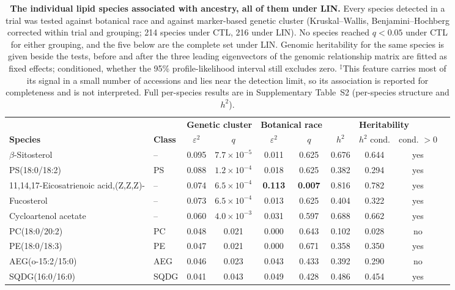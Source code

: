 \documentclass[9pt,twocolumn,twoside]{rilabRxiv}
\begin{document}
\begin{table}[!ht]
\centering
\caption{\textbf{The individual lipid species associated with ancestry, all of them under LIN.} Every species detected in a trial was tested against botanical race and against marker-based genetic cluster (Kruskal--Wallis, Benjamini--Hochberg corrected within trial and grouping; 214 species under CTL, 216 under LIN). No species reached $q<0.05$ under CTL for either grouping, and the five below are the complete set under LIN. Genomic heritability for the same species is given beside the tests, before and after the three leading eigenvectors of the genomic relationship matrix are fitted as fixed effects; conditioned, whether the 95\% profile-likelihood interval still excludes zero. $^{\ddagger}$This feature carries most of its signal in a small number of accessions and lies near the detection limit, so its association is reported for completeness and is not interpreted. Full per-species results are in Supplementary Table~S2 (per-species structure and $h^2$).}
\label{tab:species_ancestry}
\small
\begin{tabular}{llcccccccc}
\toprule
& & \multicolumn{2}{c}{\textbf{Genetic cluster}} & \multicolumn{2}{c}{\textbf{Botanical race}} & \multicolumn{3}{c}{\textbf{Heritability}} \\
\cmidrule(lr){3-4}\cmidrule(lr){5-6}\cmidrule(lr){7-9}
\textbf{Species} & \textbf{Class} & $\varepsilon^2$ & $q$ & $\varepsilon^2$ & $q$ & $h^2$ & $h^2$ cond. & cond. $>0$ \\
\midrule
$\beta$-Sitosterol & -- & 0.095 & $7.7\times10^{-5}$ & 0.011 & 0.625 & 0.676 & 0.644 & yes \\
PS(18:0/18:2) & PS & 0.088 & $1.2\times10^{-4}$ & 0.018 & 0.625 & 0.382 & 0.294 & yes \\
11,14,17-Eicosatrienoic acid,(Z,Z,Z)- & -- & 0.074 & $6.5\times10^{-4}$ & \textbf{0.113} & \textbf{0.007} & 0.816 & 0.782 & yes \\
Fucosterol & -- & 0.073 & $6.5\times10^{-4}$ & 0.013 & 0.625 & 0.404 & 0.322 & yes \\
Cycloartenol acetate & -- & 0.060 & $4.0\times10^{-3}$ & 0.031 & 0.597 & 0.688 & 0.662 & yes \\
PC(18:0/20:2) & PC & 0.048 & 0.021 & 0.000 & 0.643 & 0.102 & 0.028 & no \\
PE(18:0/18:3) & PE & 0.047 & 0.021 & 0.000 & 0.671 & 0.358 & 0.350 & yes \\
AEG(o-15:2/15:0) & AEG & 0.046 & 0.023 & 0.043 & 0.433 & 0.392 & 0.290 & no \\
SQDG(16:0/16:0) & SQDG & 0.041 & 0.043 & 0.049 & 0.428 & 0.486 & 0.454 & yes \\
\bottomrule
\end{tabular}
\end{table}
\end{document}
